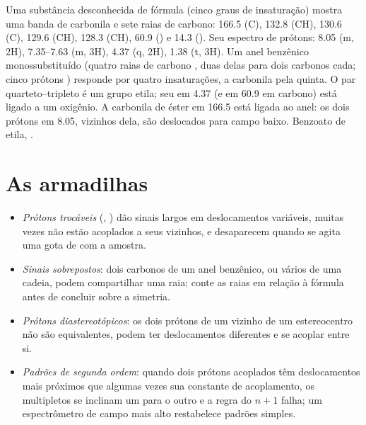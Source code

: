 \begin{example}\label{ex:b2:structure-determination:ester}
Uma substância desconhecida de fórmula  (cinco graus de insaturação) mostra uma banda de
carbonila e sete raias de carbono: 166.5 (C), 132.8 (CH), 130.6 (C), 129.6 (CH), 128.3 (CH), 60.9
() e 14.3 (). Seu espectro de prótons: 8.05 (m, 2H), 7.35--7.63 (m, 3H), 4.37 (q, 2H), 1.38
(t, 3H). Um anel benzênico monossubstituído (quatro raias de carbono , duas delas para dois
carbonos cada; cinco prótons ) responde por quatro insaturações, a carbonila pela quinta. O par
quarteto--tripleto é um grupo etila; seu  em 4.37 (e em 60.9 em carbono) está ligado a um
oxigênio. A carbonila de éster em 166.5 está ligada ao anel: os dois prótons em 8.05, vizinhos dela, são
deslocados para campo baixo. Benzoato de etila, .
\end{example}

\section{As armadilhas}

\begin{itemize}
  \item \emph{Prótons trocáveis} (, ) dão sinais largos em deslocamentos variáveis,
        muitas vezes não estão acoplados a seus vizinhos, e desaparecem quando se agita uma gota de
         com a amostra.
  \item \emph{Sinais sobrepostos}: dois carbonos de um anel benzênico, ou vários  de uma cadeia,
        podem compartilhar uma raia; conte as raias em relação à fórmula antes de concluir sobre a simetria.
  \item \emph{Prótons diastereotópicos}: os dois prótons de um  vizinho de um estereocentro não
        são equivalentes, podem ter deslocamentos diferentes e se acoplar entre si.
  \item \emph{Padrões de segunda ordem}: quando dois prótons acoplados têm deslocamentos mais próximos que
        algumas vezes sua constante de acoplamento, os multipletos se inclinam um para o outro e a regra
        do $n+1$ falha; um espectrômetro de campo mais alto restabelece padrões simples.
\end{itemize}

